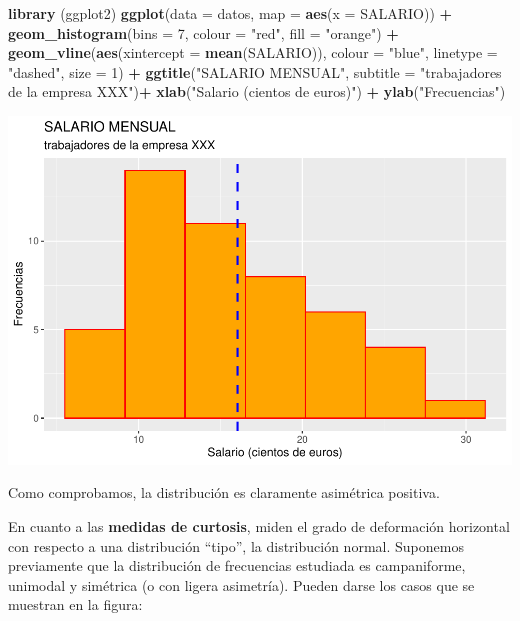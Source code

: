 \documentclass[
]{book}
\newenvironment{Shaded}{\begin{snugshade}}{\end{snugshade}}
\newcommand{\AttributeTok}[1]{\textcolor[rgb]{0.13,0.29,0.53}{#1}}
\newcommand{\DecValTok}[1]{\textcolor[rgb]{0.00,0.00,0.81}{#1}}
\newcommand{\FunctionTok}[1]{\textcolor[rgb]{0.13,0.29,0.53}{\textbf{#1}}}
\newcommand{\NormalTok}[1]{#1}
\newcommand{\SpecialCharTok}[1]{\textcolor[rgb]{0.81,0.36,0.00}{\textbf{#1}}}
\newcommand{\StringTok}[1]{\textcolor[rgb]{0.31,0.60,0.02}{#1}}
\let\Oldincludegraphics\includegraphics
\renewcommand{\includegraphics}[2][]{%
  \Oldincludegraphics[#1]{#2}%
}
\begin{document}
\begin{Shaded}
\begin{Highlighting}[]
\FunctionTok{library}\NormalTok{ (ggplot2)}
\FunctionTok{ggplot}\NormalTok{(}\AttributeTok{data =}\NormalTok{ datos, }\AttributeTok{map =} \FunctionTok{aes}\NormalTok{(}\AttributeTok{x =}\NormalTok{ SALARIO)) }\SpecialCharTok{+}
  \FunctionTok{geom\_histogram}\NormalTok{(}\AttributeTok{bins =} \DecValTok{7}\NormalTok{, }\AttributeTok{colour =} \StringTok{"red"}\NormalTok{, }\AttributeTok{fill =} \StringTok{"orange"}\NormalTok{) }\SpecialCharTok{+}
  \FunctionTok{geom\_vline}\NormalTok{(}\FunctionTok{aes}\NormalTok{(}\AttributeTok{xintercept =} \FunctionTok{mean}\NormalTok{(SALARIO)), }\AttributeTok{colour =} \StringTok{"blue"}\NormalTok{, }\AttributeTok{linetype =} \StringTok{"dashed"}\NormalTok{, }\AttributeTok{size =} \DecValTok{1}\NormalTok{) }\SpecialCharTok{+}
  \FunctionTok{ggtitle}\NormalTok{(}\StringTok{"SALARIO MENSUAL"}\NormalTok{, }\AttributeTok{subtitle =} \StringTok{"trabajadores de la empresa XXX"}\NormalTok{)}\SpecialCharTok{+}
  \FunctionTok{xlab}\NormalTok{(}\StringTok{"Salario (cientos de euros)"}\NormalTok{) }\SpecialCharTok{+}
  \FunctionTok{ylab}\NormalTok{(}\StringTok{"Frecuencias"}\NormalTok{)}
\end{Highlighting}
\end{Shaded}

\includegraphics{_main_files/figure-latex/unnamed-chunk-151-1.pdf}

Como comprobamos, la distribución es claramente asimétrica positiva.

En cuanto a las \textbf{medidas de curtosis}, miden el grado de deformación horizontal con respecto a una distribución ``tipo'', la distribución normal.
Suponemos previamente que la distribución de frecuencias estudiada es campaniforme, unimodal y simétrica (o con ligera asimetría).
Pueden darse los casos que se muestran en la figura:
\end{document}
